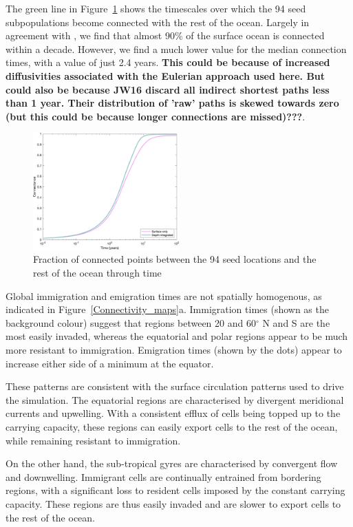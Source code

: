 \documentclass[12pt]{article}
\begin{document}
The green line in Figure~\ref{Cumulative} shows the timescales over which the 94 seed subpopulations become connected with the rest of the ocean. Largely in agreement with \citet{Jonsson:2016}, we find that almost 90\% of the surface ocean is connected within a decade. However, we find a much lower value for the median connection times, with a value of just 2.4 years. \textbf{This could be because of increased diffusivities associated with the Eulerian approach used here. But could also be because JW16 discard all indirect shortest paths less than 1 year. Their distribution of 'raw' paths is skewed towards zero (but this could be because longer connections are missed)???}.

\begin{figure}[htp!]
    \centering
        \includegraphics[width=0.5\textwidth]{../Figures/cumulative_connections.png}
\caption{Fraction of connected points between the 94 seed locations and  the rest of the ocean through time}
\label{Cumulative}
\end{figure}

Global immigration and emigration times are not spatially homogenous, as indicated in Figure~\ref{Connectivity_maps}a. Immigration times (shown as the background colour) suggest that regions between 20 and 60$^\circ$ N and S are the most easily invaded, whereas the equatorial and polar regions appear to be much more resistant  to immigration. Emigration times (shown by the dots) appear to increase either side of a minimum at the equator. 

These patterns are consistent with the surface circulation patterns used to drive the simulation. The equatorial regions are characterised by divergent meridional currents and upwelling. With a consistent efflux of cells being topped up to the carrying capacity, these regions can easily export cells to the rest of the ocean, while remaining resistant to immigration. 

On the other hand, the sub-tropical gyres are characterised by convergent flow and downwelling. Immigrant cells are continually entrained from bordering regions, with a significant loss to resident cells imposed by the constant carrying capacity. These regions are thus easily invaded and are slower to export cells to the rest of the ocean.
\end{document}
